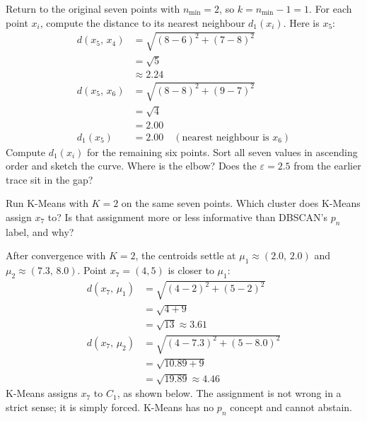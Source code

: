  Return to the original seven points with $n_{\min}{=}2$, so $k{=}n_{\min}{-}1{=}1$.
For each point $x_i$, compute the distance to its nearest neighbour $d_1(x_i)$.
Here is $x_5$:
\begin{align*}
    d(x_5,\,x_4) &= \sqrt{(8-6)^2 + (7-8)^2} \\
                 &= \sqrt{5} \\
                 &\approx 2.24 \\[4pt]
    d(x_5,\,x_6) &= \sqrt{(8-8)^2 + (9-7)^2} \\
                 &= \sqrt{4} \\
                 &= 2.00 \\[4pt]
    d_1(x_5) &= 2.00 \quad (\text{nearest neighbour is } x_6)
\end{align*}
Compute $d_1(x_i)$ for the remaining six points. Sort all seven values in ascending order and sketch the curve.
Where is the elbow? Does the $\varepsilon{=}2.5$ from the earlier trace sit in the gap?

 Run K-Means with $K{=}2$ on the same seven points.
Which cluster does K-Means assign $x_7$ to?
Is that assignment more or less informative than DBSCAN's $p_n$ label, and why?

 After convergence with $K{=}2$, the centroids settle at $\mu_1 \approx (2.0,\,2.0)$ and $\mu_2 \approx (7.3,\,8.0)$.
Point $x_7{=}(4,5)$ is closer to $\mu_1$:
\begin{align*}
    d(x_7,\,\mu_1) &= \sqrt{(4-2)^2 + (5-2)^2} \\
                   &= \sqrt{4+9} \\
                   &= \sqrt{13} \approx 3.61 \\[4pt]
    d(x_7,\,\mu_2) &= \sqrt{(4-7.3)^2 + (5-8.0)^2} \\
                   &= \sqrt{10.89+9} \\
                   &= \sqrt{19.89} \approx 4.46
\end{align*}
K-Means assigns $x_7$ to $C_1$, as shown below.
The assignment is not wrong in a strict sense; it is simply forced.
K-Means has no $p_n$ concept and cannot abstain.


